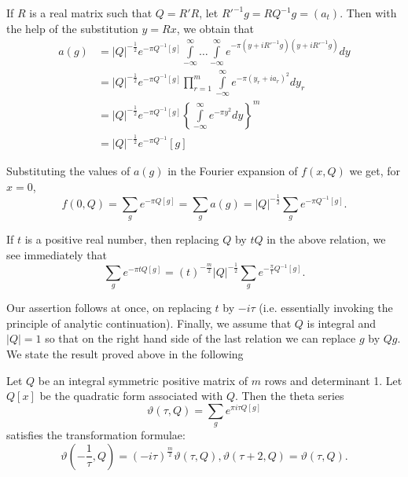 If $R$ is a real matrix such that $Q=R'R$, let
$R'^{-1}g=RQ^{-1}g=(a_t)$. Then with the help of the substitution
$y=Rx$, we obtain that 
\begin{align*}
a(g) & = |Q|^{-\frac{1}{2}} e^{-\pi Q^{-1}[g]}
\int\limits^{\infty}_{-\infty} \ldots \int\limits^{\infty}_{-\infty}
e^{-\pi (y+iR'^{-1}g)(y+i R'^{-1}g)} dy\\
& = |Q|^{-\frac{1}{2}} e^{-\pi Q^{-1}[g]} \prod^{m}_{r=1}
\int\limits^{\infty}_{-\infty} e^{-\pi(y_r+ia_r)^2} dy_r\\
& = |Q|^{-\frac{1}{2}} e^{-\pi Q^{-1}[g]}
\left\{\int\limits^{\infty}_{-\infty} e^{-\pi y^2} dy \right\}^m\\
& = |Q|^{-\frac{1}{2}} e^{-\pi Q^{-1}}[g]
\end{align*}\pageoriginale

Substituting the values of $a(g)$ in the Fourier expansion of $f(x,Q)$
we get, for $x=0$,
$$
f(0,Q) = \sum_g e^{-\pi Q [g]} = \sum_g a(g) = |Q|^{-\frac{1}{2}}
\sum_g e^{-\pi Q^{-1}[g]}.
$$

If $t$ is a positive real number, then replacing $Q$ by $tQ$ in the
above relation, we see immediately that
$$
\sum_g e^{-\pi t Q[g]} = (t)^{-\frac{m}{2}} |Q|^{-\frac{1}{2}} \sum_g
e^{-\frac{\pi}{t} Q^{-1}[g]}. 
$$

Our assertion follows at once, on replacing $t$ by $-i\tau$
(i.e. essentially invoking the principle of analytic
continuation). Finally, we assume that $Q$ is integral and $|Q|=1$ so
that on the right hand side of the last relation we can replace $g$
by $Qg$. We state the result proved above in the following 


\setcounter{thm}{14}
\begin{thm}\label{chap3:thm15}
Let $Q$ be an integral symmetric positive matrix of $m$ rows and
determinant 1. Let $Q[x]$ be the quadratic form associated with $Q$. 
Then \pageoriginale the theta series
$$
\vartheta (\tau, Q) = \sum_g e^{\pi i \tau Q[g]}
$$
satisfies the transformation formulae:
$$
\vartheta\left(-\frac{1}{\tau}, Q\right) = (-i\tau)^{\frac{m}{2}}
\vartheta(\tau, Q), \vartheta(\tau+2,Q) = \vartheta(\tau, Q).
$$
\end{thm}


